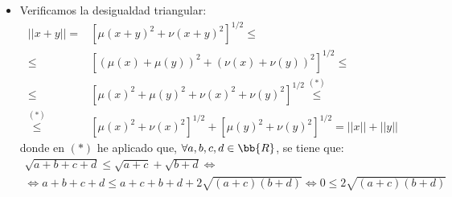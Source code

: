 \begin{ejercicio}
\begin{enumerate}
\begin{itemize}
            \item Verificamos la desigualdad triangular:
                \begin{equation*}
                    \begin{split}
                        ||x+y||
                        =& \left[\mu (x+y)^{2} + \nu(x+y)^2\right]^{1/2} \leq \\
                        \leq & \left[(\mu (x) + \mu(y))^2 + (\nu (x) + \nu(y))^2\right]^{1/2}
                        \leq \\
                        \leq & \left[\mu (x)^2 + \mu(y)^2 + \nu (x)^2 + \nu(y)^2\right]^{1/2}
                        \stackrel{(\ast)}{\leq} \\
                        \stackrel{(\ast)}{\leq} & \left[\mu (x)^{2} + \nu(x)^2\right]^{1/2} + \left[\mu (y)^{2} + \nu(y)^2\right]^{1/2}
                        = ||x|| + ||y||
                    \end{split}
                \end{equation*}
                donde en $(\ast)$ he aplicado que, $\forall a,b,c,d\in \bb{R}$, se tiene que:
                \begin{multline*}
                    \sqrt{a+b+c+d}\leq \sqrt{a+c} + \sqrt{b+d} \Longleftrightarrow \\ \Longleftrightarrow a+b+c+d \leq a+c+b+d + 2\sqrt{(a+c)(b+d)} \Longleftrightarrow 0\leq 2\sqrt{(a+c)(b+d)}
                \end{multline*}
            \end{itemize}
    \end{enumerate}
\end{ejercicio}

